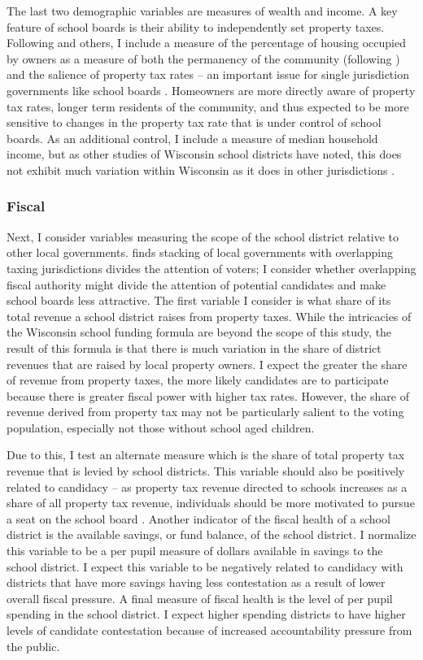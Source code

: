 The last two demographic variables are measures of wealth and income. A key feature 
of school boards is 
their ability to independently set property taxes. Following \citet{berry2} and 
others, I include a measure of the percentage of housing occupied by owners as a 
measure of both the permanency of the community (following \citet{oliver}) and the 
salience of property tax rates -- an important issue for single jurisdiction 
governments like school boards \citep{berry2}. Homeowners are more directly aware 
of property tax rates, longer term residents of the community, and thus expected 
to be more sensitive to changes in the property tax rate that is under control 
of school boards. As an additional control, I include a measure of median household 
income, but as other studies of Wisconsin school districts have noted, this does 
not exhibit much variation within Wisconsin as it does in other jurisdictions 
\citep{akrTax}.

\subsubsection{Fiscal}

Next, I consider variables measuring the scope of the school district relative 
to other local governments. \citet{berry2} finds stacking of local governments 
with overlapping taxing jurisdictions divides the attention of voters; I consider 
whether overlapping fiscal authority might divide the attention of potential 
candidates and make school boards less attractive. The first variable I consider 
is what share of its total revenue a school district raises from property taxes. 
While the intricacies of the Wisconsin school funding formula are beyond the 
scope of this study, the result of this formula is that there is much variation 
in the share of district revenues that are raised by local property owners. 
I expect the greater the share of revenue from property taxes, the more likely 
candidates are to participate because there is greater fiscal power with higher 
tax rates. However, the share of revenue derived from 
property tax may not be particularly salient to the voting population, especially 
not those without school aged children. 

Due to this, I test an alternate measure which is the share of total property tax 
revenue that is levied by school districts. This variable should also be positively 
related to candidacy -- as property tax revenue directed to schools increases as 
a share of all property tax revenue, individuals should be more motivated to 
pursue a seat on the school board \citep{berry2, oliver}.
Another indicator of the fiscal health of a school district is the available 
savings, or fund balance, of the school district. I normalize this variable to 
be a per pupil measure of dollars available in savings to the school district. 
I expect this variable to be negatively related to candidacy with districts 
that have more savings having less contestation as a result of lower overall 
fiscal pressure. A final measure of fiscal health is the level of per pupil 
spending in the school district. I expect higher spending districts to have 
higher levels of candidate contestation because of increased accountability 
pressure from the public.

